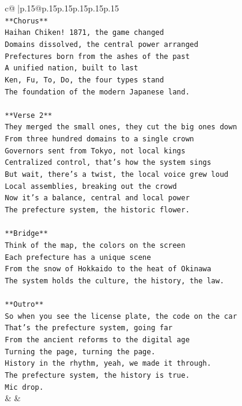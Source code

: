 \documentclass{article}
\begin{document}
{\begin{supertabular}{c@{$\;$}|p{.15\linewidth}@{}p{.15\linewidth}p{.15\linewidth}p{.15\linewidth}p{.15\linewidth}p{.15\linewidth}}
{{{\\ 
\texttt{**Chorus**} \\
\texttt{Haihan Chiken! 1871, the game changed} \\
\texttt{Domains dissolved, the central power arranged} \\
\texttt{Prefectures born from the ashes of the past} \\
\texttt{A unified nation, built to last} \\
\texttt{Ken, Fu, To, Do, the four types stand} \\
\texttt{The foundation of the modern Japanese land.} \\
\\ 
\texttt{**Verse 2**} \\
\texttt{They merged the small ones, they cut the big ones down} \\
\texttt{From three hundred domains to a single crown} \\
\texttt{Governors sent from Tokyo, not local kings} \\
\texttt{Centralized control, that's how the system sings} \\
\texttt{But wait, there's a twist, the local voice grew loud} \\
\texttt{Local assemblies, breaking out the crowd} \\
\texttt{Now it's a balance, central and local power} \\
\texttt{The prefecture system, the historic flower.} \\
\\ 
\texttt{**Bridge**} \\
\texttt{Think of the map, the colors on the screen} \\
\texttt{Each prefecture has a unique scene} \\
\texttt{From the snow of Hokkaido to the heat of Okinawa} \\
\texttt{The system holds the culture, the history, the law.} \\
\\ 
\texttt{**Outro**} \\
\texttt{So when you see the license plate, the code on the car} \\
\texttt{That's the prefecture system, going far} \\
\texttt{From the ancient reforms to the digital age} \\
\texttt{Turning the page, turning the page.} \\
\texttt{History in the rhythm, yeah, we made it through.} \\
\texttt{The prefecture system, the history is true.} \\
\texttt{Mic drop.} \\
            }
        }
    }
    & & \\ \\


\end{supertabular}}
\end{document}

